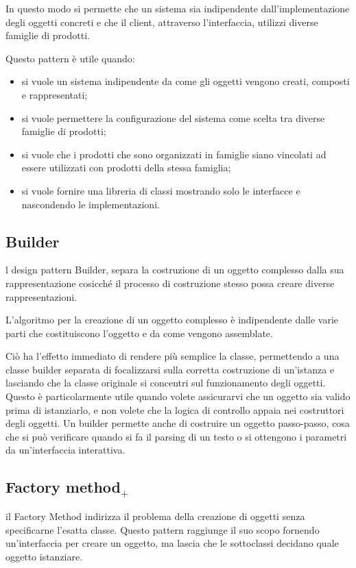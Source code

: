 In questo modo si permette che un sistema sia indipendente dall'implementazione degli oggetti concreti e che il client, attraverso l'interfaccia, utilizzi diverse famiglie di prodotti.

Questo pattern è utile quando:
\begin{itemize}
	\item si vuole un sistema indipendente da come gli oggetti vengono creati, composti e rappresentati;
	\item si vuole permettere la configurazione del sistema come scelta tra diverse famiglie di prodotti;
	\item si vuole che i prodotti che sono organizzati in famiglie siano vincolati ad essere utilizzati con prodotti della stessa famiglia;
	\item si vuole fornire una libreria di classi mostrando solo le interfacce e nascondendo le implementazioni.
\end{itemize}
\subsection{Builder}
l design pattern Builder, separa la costruzione di un oggetto complesso dalla sua rappresentazione cosicché il processo di costruzione stesso possa creare diverse rappresentazioni.

L'algoritmo per la creazione di un oggetto complesso è indipendente dalle varie parti che costituiscono l'oggetto e da come vengono assemblate.

Ciò ha l'effetto immediato di rendere più semplice la classe, permettendo a una classe builder separata di focalizzarsi sulla corretta costruzione di un'istanza e lasciando che la classe originale si concentri sul funzionamento degli oggetti. Questo è particolarmente utile quando volete assicurarvi che un oggetto sia valido prima di istanziarlo, e non volete che la logica di controllo appaia nei costruttori degli oggetti. Un builder permette anche di costruire un oggetto passo-passo, cosa che si può verificare quando si fa il parsing di un testo o si ottengono i parametri da un'interfaccia interattiva.

\subsection{Factory method$_+$}
il Factory Method indirizza il problema della creazione di oggetti senza specificarne l'esatta classe. Questo pattern raggiunge il suo scopo fornendo un'interfaccia per creare un oggetto, ma lascia che le sottoclassi decidano quale oggetto istanziare.

